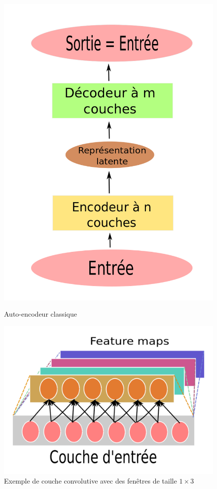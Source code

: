 \documentclass[a4paper, 11pt, onecolumn]{article}
\begin{document}
\begin{figure}\centering
  \begin{minipage}{0.325\linewidth}
    \includegraphics[width=\linewidth]{Autoencoder}
    \caption{Auto-encodeur classique}
  \end{minipage}
  \hfill
  \begin{minipage}{0.65\linewidth}
    \includegraphics[width=\linewidth]{Conv}
    \caption{Exemple de couche convolutive avec des fenêtres de taille $1\times 3$}
  \end{minipage}
\end{figure}
\end{document}
